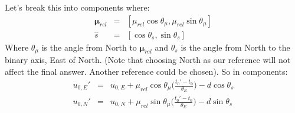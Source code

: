 \documentclass[twocolumn]{aastex701}
\newcommand{\vect}[1]{\boldsymbol{#1}}
\begin{document}
Let's break this into components where:
\begin{eqnarray}
    \vect{\mu}_{rel} &=& [\mu_{rel}\cos\theta_{\mu}, \mu_{rel}\sin\theta_{\mu}] \\
    \hat{s} &=& [\cos\theta_{s}, \sin\theta_{s}]
\end{eqnarray}
Where $\theta_{\mu}$ is the angle from North to $\vect{\mu}_{rel}$ and $\theta_s$ is the angle from North to the binary axis, East of North. (Note that choosing North as our reference will not affect the final answer. Another reference could be chosen). 
So in components:
\begin{eqnarray}
\label{eq: u0', x}
    u_{0, E}' &=& u_{0, E} + \mu_{rel}\cos\theta_{\mu}\Big(\frac{t_0' - t_0}{\theta_E}\Big) - d\cos\theta_s \\
\label{eq: u0', y}
    u_{0, N}' &=& u_{0, N} + \mu_{rel}\sin\theta_{\mu}\Big(\frac{t_0' - t_0}{\theta_E}\Big) - d\sin\theta_s
\end{eqnarray}
\end{document}
